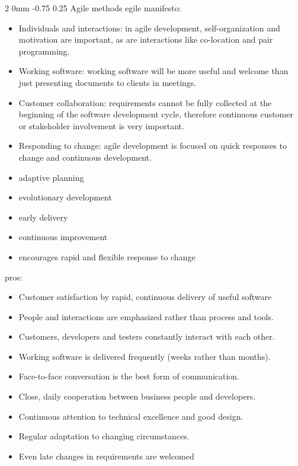 \documentclass[a4paper,11pt]{article}
\makeatletter
\renewcommand{\subsection}{\@startsection
   {subsection}%
   {2}%
   {0mm}%
   {-0.75\baselineskip}%
   {0.25\baselineskip}%
   {\rmfamily\normalfont\slshape\normalsize}}%
\makeatother
\begin{document}
\subsection{Agile methods}
egile manifesto:
\begin{itemize}
\item Individuals and interactions: in agile development, self-organization and motivation are important, as are interactions like co-location and pair programming.
\item Working software: working software will be more useful and welcome than just presenting documents to clients in meetings.
\item Customer collaboration: requirements cannot be fully collected at the beginning of the software development cycle, therefore continuous customer or stakeholder involvement is very important.
\item Responding to change: agile development is focused on quick responses to change and continuous development.

\end{itemize}
\begin{itemize}
\item adaptive planning
\item evolutionary development
\item early delivery
\item continuous improvement
\item encourages rapid and flexible response to change
\end{itemize}
pros:
\begin{itemize}
\item Customer satisfaction by rapid, continuous delivery of useful software
\item People and interactions are emphasized rather than process and tools.
\item Customers, developers and testers constantly interact with each other.
\item Working software is delivered frequently (weeks rather than months).
\item Face-to-face conversation is the best form of communication.
\item Close, daily cooperation between business people and developers.
\item Continuous attention to technical excellence and good design.
\item Regular adaptation to changing circumstances.
\item Even late changes in requirements are welcomed
\end{itemize}
\end{document}
